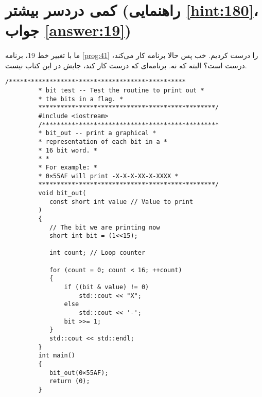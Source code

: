 \section[کمی دردسر بیشتر]{کمی دردسر بیشتر \protect{} (راهنمایی \ref{hint:180}، جواب \ref{answer:19})}
\paragraph{}\label{prog:42}
ما با تغییر خط 19، برنامه \ref{prog:41} را درست کردیم. خب پس حالا برنامه کار می‌کند، درست است؟ البته که نه. برنامه‌ای که درست کار کند، جایش در این کتاب نیست.

\begin{LTR}
    \begin{lstlisting}[style=C++Style]
         /************************************************
         * bit test -- Test the routine to print out *
         * the bits in a flag. *
         ************************************************/
         #include <iostream>
         /************************************************
         * bit_out -- print a graphical *
         * representation of each bit in a *
         * 16 bit word. *
         * *
         * For example: *
         * 0×55AF will print -X-X-X-XX-X-XXXX *
         ************************************************/
         void bit_out(
         	const short int value // Value to print
         )
         {
         	// The bit we are printing now
         	short int bit = (1<<15);

         	int count; // Loop counter

         	for (count = 0; count < 16; ++count)
         	{
         		if ((bit & value) != 0)
         			std::cout << "X";
         		else
         			std::cout << '-';
         		bit >>= 1;
         	}
         	std::cout << std::endl;
         }
         int main()
         {
         	bit_out(0×55AF);
         	return (0);
         }
    \end{lstlisting}
\end{LTR}